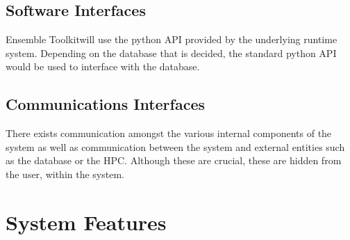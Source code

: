 \documentclass{scrreprt}
\def\entk{Ensemble Toolkit}
\begin{document}
\section{Software Interfaces}

\entk will use the python API provided by the underlying runtime system. Depending on the database that is decided, the standard python API would be used to interface with the database.

\section{Communications Interfaces}

There exists communication amongst the various internal components of the system as well as communication between the system and external entities such as the database or the HPC. Although these are crucial, these are hidden from the user, within the system.

\chapter{System Features}
\end{document}
